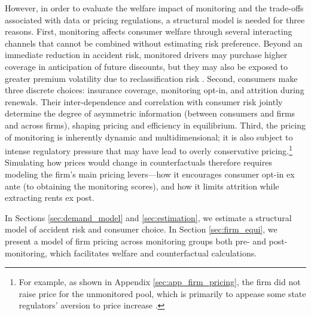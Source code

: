 However, in order to evaluate the welfare impact of monitoring and the trade-offs associated with data or pricing regulations, a structural model is needed for three reasons.
First, monitoring affects consumer welfare through several interacting channels that cannot be combined without estimating risk preference. Beyond an immediate reduction in accident risk,
monitored drivers may purchase higher coverage in anticipation of future discounts, but they may also be exposed to greater premium volatility due to reclassification risk \parencite{Handel2015}. Second, consumers make three discrete choices: insurance coverage, monitoring opt-in, and attrition during renewals. Their inter-dependence and correlation with consumer risk jointly determine the degree of asymmetric information (between consumers and firms and across firms), shaping pricing and efficiency in equilibrium.
Third, the pricing of monitoring is inherently dynamic and multidimensional; it is also subject to intense regulatory pressure that may have lead to overly conservative pricing.\footnote{For example, as shown in Appendix \ref{sec:app_firm_pricing}, the firm did not raise price for the unmonitored pool, which is primarily to appease some state regulators' aversion to price increase \parencite{ben2023privacy}.} Simulating how prices would change in counterfactuals therefore requires modeling the firm's main pricing levers---how it encourages consumer opt-in ex ante (to obtaining the monitoring scores), and how it limits attrition while extracting rents ex post.

In Sections \ref{sec:demand_model} and \ref{sec:estimation}, we estimate a structural model of accident risk and consumer choice. In Section \ref{sec:firm_equi}, we present a model of firm pricing across monitoring groups both pre- and post-monitoring, which facilitates welfare and counterfactual calculations.
